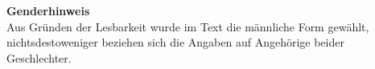 \documentclass[12pt,a4paper]{report}
\begin{document}
	\maketitlenew

	\tableofcontentsnew
	\newpage

  \listoffigures
  \clearpage
  \textbf{Genderhinweis}\\
Aus Gründen der Lesbarkeit wurde im Text die männliche Form gewählt, nichtsdestoweniger beziehen sich die Angaben auf Angehörige beider Geschlechter.
  
  
  
  
  
  
  
  
\end{document}
